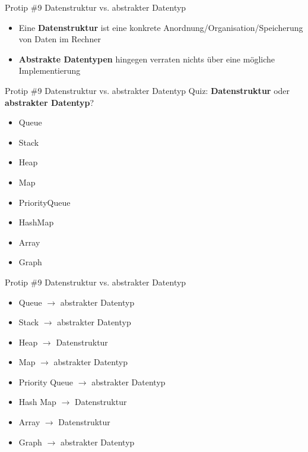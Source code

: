 \documentclass[18pt]{beamer}
\begin{document}
\begin{frame}{Protip \#9 Datenstruktur vs. abstrakter Datentyp}
    \begin{itemize}
        \item Eine \textbf{Datenstruktur} ist eine konkrete Anordnung/Organisation/Speicherung von Daten im Rechner
        \vspace{.2in}
        \item \textbf{Abstrakte Datentypen} hingegen verraten nichts über eine mögliche Implementierung
    \end{itemize}
\end{frame}

\begin{frame}{Protip \#9 Datenstruktur vs. abstrakter Datentyp}
    Quiz: \textbf{Datenstruktur} oder \textbf{abstrakter Datentyp}?
    \begin{itemize}
        \item Queue
        \item Stack
        \item Heap
        \item Map
        \item PriorityQueue
        \item HashMap
        \item Array
        \item Graph
    \end{itemize}
\end{frame}

\begin{frame}{Protip \#9 Datenstruktur vs. abstrakter Datentyp}
    \quad
    \begin{itemize}
        \item Queue $\rightarrow$ \alert{abstrakter Datentyp}
        \item Stack $\rightarrow$ \alert{abstrakter Datentyp}
        \item Heap $\rightarrow$ \alert{Datenstruktur}
        \item Map $\rightarrow$ \alert{abstrakter Datentyp}
        \item Priority Queue $\rightarrow$ \alert{abstrakter Datentyp}
        \item Hash Map $\rightarrow$ \alert{Datenstruktur}
        \item Array $\rightarrow$ \alert{Datenstruktur}
        \item Graph $\rightarrow$ \alert{abstrakter Datentyp}
    \end{itemize}
\end{frame}
\end{document}
